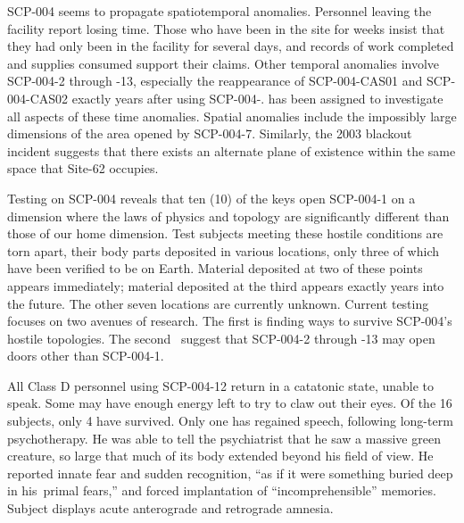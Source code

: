 \begin{flushleft}
\end{flushleft}

SCP-004 seems to propagate spatiotemporal anomalies. Personnel leaving the facility report losing time. Those who have been in the site for weeks insist that they had only been in the facility for several days, and records of work completed and supplies consumed support their claims. Other temporal anomalies involve SCP-004-2 through -13, especially the reappearance of SCP-004-CAS01 and SCP-004-CAS02 exactly  years after using SCP-004-.  has been assigned to investigate all aspects of these time anomalies. Spatial anomalies include the impossibly large dimensions of the area opened by SCP-004-7. Similarly, the 2003 blackout incident suggests that there exists an alternate plane of existence within the same space that Site-62 occupies.

\begin{flushleft}
\end{flushleft}

Testing on SCP-004 reveals that ten (10) of the keys open SCP-004-1 on a dimension where the laws of physics and topology are significantly different than those of our home dimension. Test subjects meeting these hostile conditions are torn apart, their body parts deposited in various locations, only three of which have been verified to be on Earth. Material deposited at two of these points appears immediately; material deposited at the third appears exactly  years into the future. The other seven locations are currently unknown.
\newpage
Current testing focuses on two avenues of research. The first is finding ways to survive SCP-004’s hostile topologies. The second \expunged \ suggest that SCP-004-2 through -13 may open doors other than SCP-004-1.

\begin{flushleft}
\end{flushleft}

All Class D personnel using SCP-004-12 return in a catatonic state, unable to speak. Some may have enough energy left to try to claw out their eyes. Of the 16 subjects, only 4 have survived. Only one has regained speech, following long-term psychotherapy. He was able to tell the psychiatrist that he saw a massive green creature, so large that much of its body extended beyond his field of view. He reported innate fear and sudden recognition, “as if it were something buried deep in \lb his\rb \ primal fears,” and forced implantation of “incomprehensible” memories. Subject displays acute anterograde and retrograde amnesia.

